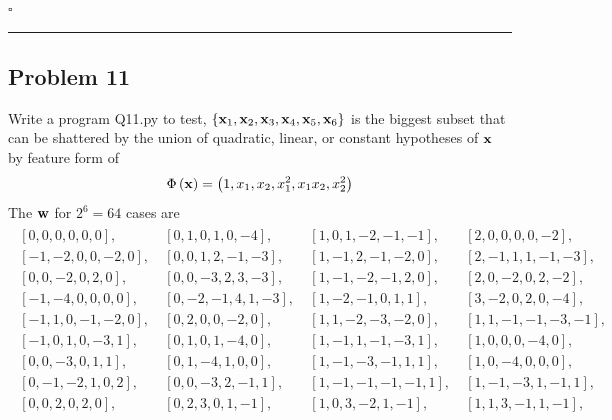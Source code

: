 \documentclass[12pt]{article}
\newcommand*{\QEDB}{\hfill\ensuremath{\square}}
\newcommand{\CBrackets}[1]{\left\{#1\right\}}
\newcommand{\ParTh}[1]{\left(#1\right)}
\newcommand{\BF}[1]{{\bf#1}}
\newcommand{\horrule}[1]{\rule{\linewidth}{#1}}
\begin{document}
\QEDB

\horrule{0.5pt}

\subsection*{Problem 11}

Write a program Q11.py to test, $\CBrackets{\BF{x}_1,\BF{x}_2,\BF{x}_3,\BF{x}_4,\BF{x}_5,\BF{x}_6}$ is the biggest subset that can be shattered by the union of quadratic, linear, or constant hypotheses of $\BF{x}$ by feature form of
\begin{align}
\Phi\ParTh{\BF{x}}=\ParTh{1,x_1,x_2,x^2_1,x_1x_2,x^2_2}
\end{align}
The $\BF{w}$ for $2^6=64$ cases are
\begin{align}
\begin{array}{llll}
\left[ 0,  0,  0,  0,  0,  0\right],~&\left[ 0,  1,  0,  1,  0, -4\right],~&\left[ 1,  0,  1, -2, -1, -1\right],~&\left[ 2,  0,  0,  0,  0, -2\right],\\
\left[-1, -2,  0,  0, -2,  0\right],~&\left[ 0,  0,  1,  2, -1, -3\right],~&\left[ 1, -1,  2, -1, -2,  0\right],~&\left[ 2, -1,  1,  1, -1, -3\right],\\
\left[ 0,  0, -2,  0,  2,  0\right],~&\left[ 0,  0, -3,  2,  3, -3\right],~&\left[ 1, -1, -2, -1,  2,  0\right],~&\left[ 2,  0, -2,  0,  2, -2\right],\\
\left[-1, -4,  0,  0,  0,  0\right],~&\left[ 0, -2, -1,  4,  1, -3\right],~&\left[ 1, -2, -1,  0,  1,  1\right],~&\left[ 3, -2,  0,  2,  0, -4\right],\\
\left[-1,  1,  0, -1, -2,  0\right],~&\left[ 0,  2,  0,  0, -2,  0\right],~&\left[ 1,  1, -2, -3, -2,  0\right],~&\left[ 1,  1, -1, -1, -3, -1\right],\\
\left[-1,  0,  1,  0, -3,  1\right],~&\left[ 0,  1,  0,  1, -4,  0\right],~&\left[ 1, -1,  1, -1, -3,  1\right],~&\left[ 1,  0,  0,  0, -4,  0\right],\\
\left[ 0,  0, -3,  0,  1,  1\right],~&\left[ 0,  1, -4,  1,  0,  0\right],~&\left[ 1, -1, -3, -1,  1,  1\right],~&\left[ 1,  0, -4,  0,  0,  0\right],\\
\left[ 0, -1, -2,  1,  0,  2\right],~&\left[ 0,  0, -3,  2, -1,  1\right],~&\left[ 1, -1, -1, -1, -1,  1\right],~&\left[ 1, -1, -3,  1, -1,  1\right],\\
\left[ 0,  0,  2,  0,  2,  0\right],~&\left[ 0,  2,  3,  0,  1, -1\right],~&\left[ 1,  0,  3, -2,  1, -1\right],~&\left[ 1,  1,  3, -1,  1, -1\right],\\

\end{array}
\end{align}
\end{document}
